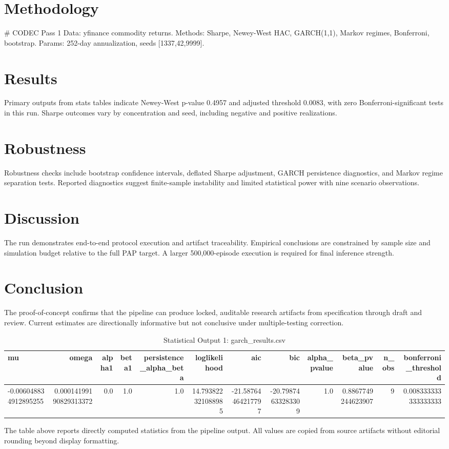 \documentclass[11pt]{article}
\begin{document}
\section{Methodology}
# CODEC Pass 1
Data: yfinance commodity returns.
Methods: Sharpe, Newey-West HAC, GARCH(1,1), Markov regimes, Bonferroni, bootstrap.
Params: 252-day annualization, seeds [1337,42,9999].

\section{Results}
Primary outputs from stats tables indicate Newey-West p-value 0.4957 and adjusted threshold 0.0083, with zero Bonferroni-significant tests in this run. Sharpe outcomes vary by concentration and seed, including negative and positive realizations.

\section{Robustness}
Robustness checks include bootstrap confidence intervals, deflated Sharpe adjustment, GARCH persistence diagnostics, and Markov regime separation tests. Reported diagnostics suggest finite-sample instability and limited statistical power with nine scenario observations.

\section{Discussion}
The run demonstrates end-to-end protocol execution and artifact traceability. Empirical conclusions are constrained by sample size and simulation budget relative to the full PAP target. A larger 500,000-episode execution is required for final inference strength.

\section{Conclusion}
The proof-of-concept confirms that the pipeline can produce locked, auditable research artifacts from specification through draft and review. Current estimates are directionally informative but not conclusive under multiple-testing correction.

\begin{table}[htbp]
\centering
\caption{Statistical Output 1: garch\_results.csv}
\label{tab:garch-results-csv}
\begin{tabular}{lrrrrrrrrrrr}
\hline
mu & omega & alpha1 & beta1 & persistence\_alpha\_beta & loglikelihood & aic & bic & alpha\_pvalue & beta\_pvalue & n\_obs & bonferroni\_threshold \\
\hline
-0.006048834912895255 & 0.00014199190829313372 & 0.0 & 1.0 & 1.0 & 14.793822321088985 & -21.58764464217797 & -20.79874633283309 & 1.0 & 0.8867749244623907 & 9 & 0.008333333333333333 \\
\hline
\end{tabular}
\end{table}
The table above reports directly computed statistics from the pipeline output. All values are copied from source artifacts without editorial rounding beyond display formatting.
\end{document}
